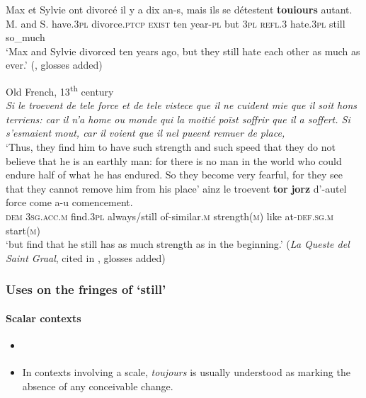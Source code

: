 \begin{exe}
	\ex 
	\gll Max et Sylvie ont divorcé {il y a} dix an-s, mais ils se détestent \textbf{touiours} autant.\\
	M. and S. have.3\textsc{pl} divorce.\textsc{ptcp} \textsc{exist} ten year-\textsc{pl} but 3\textsc{pl} \textsc{refl}.3 hate.3\textsc{pl} still so\_much\\
	\glt \lq Max and Sylvie divorced ten years ago, but they still hate each other as much as ever.\rq{ }(\cite[24]{MosegaardHansen2002}, glosses added)
	
	\ex Old French, 13\textsuperscript{th} century\label{exAppendixFrenchToujours2}\\
	\textit{Si le troevent de tele force et de tele vistece que il ne cuident mie que il soit hons terriens: car il n’a home ou monde qui la moitié poïst soffrir que il a soffert. Si s’esmaient mout, car il voient que il nel pueent remuer de place,}\\
\lq Thus, they find him to have such strength and such speed that they do not believe that he is an earthly man: for there is no man in the world who could endure half of what he has endured. So they become very fearful, for they see that they cannot remove him from his place'
\exi{}
\gll ainz le troevent {\textbf{tor} \textbf{jorz}} d\rq{}-autel force come a-u comencement.\\
\textsc{dem} 3\textsc{sg}.\textsc{acc}.\textsc{m} find.3\textsc{pl} always/still of-similar.\textsc{m} strength(\textsc{m}) like at-\textsc{def}.\textsc{sg}.\textsc{m} start(\textsc{m})\\
\glt \lq but find that he still has as much strength as in the beginning.\rq{ }(\textit{La Queste del Saint Graal}, cited in \cite[149]{MosegaardHansen2008}, glosses added) 

\end{exe}


\subsubsection{Uses on the fringes of \lq{}still\rq{}}
\paragraph{Scalar contexts}
\begin{itemize}
	\item \textcite{Muller1991}
	\item In contexts involving a scale, \textit{toujours} is usually understood as marking the absence of any conceivable change.
	
\end{itemize}

